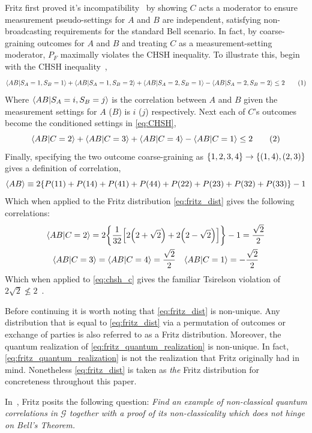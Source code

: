 \documentclass[aps, 10pt, english, twoside, pra, nofootinbib, longbibliography]{revtex4-1}
\theoremstyle{plain}
\theoremstyle{definition}
\theoremstyle{remark}
\newcommand{\graph}{\mathcal{G}}
\newcommand{\ts}{{\graph}}
\begin{document}
    Fritz first proved it's incompatibility~\cite{Fritz_2012} by showing $C$ acts a moderator to ensure measurement pseudo-settings for $A$ and $B$ are independent, satisfying non-broadcasting requirements for the standard Bell scenario. In fact, by coarse-graining outcomes for $A$ and $B$ and treating $C$ as a measurement-setting moderator, $P_F$ maximally violates the CHSH inequality. To illustrate this, begin with the CHSH inequality~\cite{CHSH_Original},
    \[ \ba{AB|S_A=1, S_B=1} + \ba{AB|S_A=1, S_B=2} + \ba{AB|S_A=2, S_B=1} - \ba{AB|S_A=2, S_B=2} \leq 2 \eq \label{eq:CHSH}\]
    Where $\ba{AB|S_A=i, S_B=j}$ is the correlation between $A$ and $B$ given the measurement settings for $A$ ($B$) is $i$ ($j$) respectively. Next each of $C$'s outcomes become the conditioned settings in \cref{eq:CHSH},
    \[ \ba{AB|C=2} + \ba{AB|C=3} + \ba{AB|C=4} - \ba{AB|C=1} \leq 2 \eq \label{eq:chsh_c}\]
    Finally, specifying the two outcome coarse-graining as $\bc{1,2,3,4} \rightarrow \bc{\br{1,4}, \br{2,3}}$ gives a definition of correlation,
    \[ \ba{AB} \defined 2\bc{\prob[][11] + \prob[][14] + \prob[][41] + \prob[][44] + \prob[][22] + \prob[][23] + \prob[][32] + \prob[][33]} - 1 \]
    Which when applied to the Fritz distribution \cref{eq:fritz_dist} gives the following correlations:
    \begin{gather*}
    \ba{AB|C=2} = 2 \bc{\f{1}{32}\bs{2\br{2+\sqrt{2}}+2\br{2-\sqrt{2}}}} - 1 = \f{\sqrt{2}}{2} \\
    \ba{AB|C=3} = \ba{AB|C=4} = \f{\sqrt{2}}{2} \quad \ba{AB|C=1} = -\f{\sqrt{2}}{2}
    \end{gather*}
    Which when applied to \cref{eq:chsh_c} gives the familiar Tsirelson violation of $2\sqrt{2} \not\leq 2$~\cite{Cirelson_1980}.

    Before continuing it is worth noting that \cref{eq:fritz_dist} is non-unique. Any distribution that is equal to \cref{eq:fritz_dist} via a permutation of outcomes or exchange of parties is also referred to as a Fritz distribution. Moreover, the quantum realization of \cref{eq:fritz_quantum_realization} is non-unique. In fact, \cref{eq:fritz_quantum_realization} is not the realization that Fritz originally had in mind. Nonetheless \cref{eq:fritz_dist} is taken as \textit{the} Fritz distribution for concreteness throughout this paper.

    In~\cite{Fritz_2012}, Fritz posits the following question: \textit{Find an example of non-classical quantum correlations in $\ts$ together with a proof of its non-classicality which does not hinge on Bell’s Theorem.}
\end{document}
